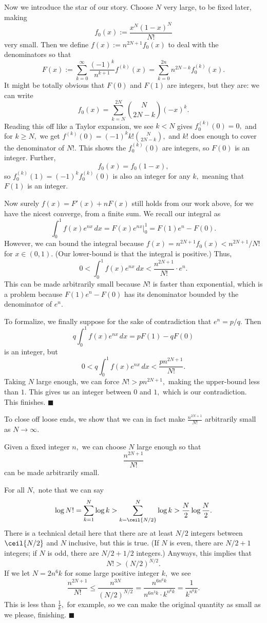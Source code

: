 Now we introduce the star of our story. Choose $N$ very large, to be fixed later, making
\[f_0(x):=\frac{x^N(1-x)^N}{N!}\]
very small. Then we define $f(x):=n^{2N+1}f_0(x)$ to deal with the denominators so that
\[F(x):=\sum_{k=0}^\infty\frac{(-1)^k}{n^{k+1}}f^{(k)}(x)=\sum_{k=0}^{2n}n^{2N-k}f_0^{(k)}(x).\]
It might be totally obvious that $F(0)$ and $F(1)$ are integers, but they are: we can write
\[f_0(x)=\sum_{k=N}^{2N}\binom N{2N-k}(-x)^k.\]
Reading this off like a Taylor expansion, we see $k<N$ gives $f_0^{(k)}(0)=0,$ and for $k\ge N,$ we get $f^{(k)}(0)=(-1)^kk!\binom N{2N-k},$ and $k!$ does enough to cover the denominator of $N!.$ This shows the $f_0^{(k)}(0)$ are integers, so $F(0)$ is an integer. Further,
\[f_0(x)=f_0(1-x),\]
so $f_0^{(k)}(1)=(-1)^kf_0^{(k)}(0)$ is also an integer for any $k,$ meaning that $F(1)$ is an integer.

Now surely $f(x)=F'(x)+nF(x)$ still holds from our work above, for we have the nicest converge, from a finite sum. We recall our integral as
\[\int_0^1f(x)e^{nx}\,dx=F(x)e^{nx}\bigg|_0^1=F(1)e^n-F(0).\]
However, we can bound the integral because $f(x)=n^{2N+1}f_0(x)<n^{2N+1}/N!$ for $x\in(0,1).$ (Our lower-bound is that the integral is positive.) Thus,
\[0<\int_0^1f(x)e^{nx}\,dx<\frac{n^{2N+1}}{N!}\cdot e^n.\]
This can be made arbitrarily small because $N!$ is faster than exponential, which is a problem because $F(1)e^n-F(0)$ has its denominator bounded by the denominator of $e^n.$

To formalize, we finally suppose for the sake of contradiction that $e^n=p/q.$ Then
\[q\int_0^1f(x)e^{nx}\,dx=pF(1)-qF(0)\]
is an integer, but
\[0<q\int_0^1f(x)e^{nx}\,dx<\frac{pn^{2N+1}}{N!}.\]
Taking $N$ large enough, we can force $N!>pn^{2N+1},$ making the upper-bound less than $1.$ This gives us an integer between $0$ and $1,$ which is our contradiction. This finishes. $\blacksquare$

To close off loose ends, we show that we can in fact make $\frac{n^{2N+1}}{N!}$ arbitrarily small as $N\to\infty.$
\begin{lemma}
    Given a fixed integer $n,$ we can choose $N$ large enough so that
    \[\frac{n^{2N+1}}{N!}\]
    can be made arbitrarily small.
\end{lemma}
For all $N,$ note that we can say
\[\log N!=\sum_{k=1}^N\log k>\sum_{k=\ceil{N/2}}^N\log k>\frac N2\log\frac N2.\]
There is a technical detail here that there are at least $N/2$ integers between $\ceil{N/2}$ and $N$ inclusive, but this is true. (If $N$ is even, there are $N/2+1$ integers; if $N$ is odd, there are $N/2+1/2$ integers.) Anyways, this implies that
\[N!>(N/2)^{N/2}.\]
If we let $N=2n^6k$ for some large positive integer $k,$ we see
\[\frac{n^{2N+1}}{N!}\le\frac{n^{3N}}{(N/2)^{N/2}}=\frac{n^{6n^6k}}{n^{6n^3k}\cdot k^{n^6k}}=\frac1{k^{n^6k}}.\]
This is less than $\frac1k,$ for example, so we can make the original quantity as small as we please, finishing. $\blacksquare$

